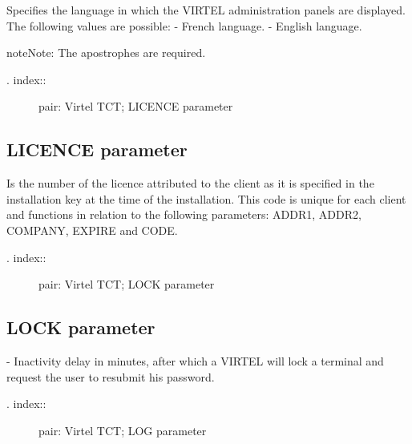 \documentclass[letterpaper,10pt,english]{sphinxmanual}
\begin{document}
Specifies the language in which the VIRTEL administration panels are displayed. The following values are possible:
 - French language.
 - English language.

\begin{sphinxadmonition}{note}{Note:}
The apostrophes are required.
\end{sphinxadmonition}
\begin{description}
\item[{. index::}] \leavevmode
pair: Virtel TCT; LICENCE parameter

\end{description}


\subsection{LICENCE parameter}
\label{\detokenize{Installation_Guide:licence-parameter}}
\begin{sphinxVerbatim}[commandchars=\\\{\}]
                          
\end{sphinxVerbatim}

Is the number of the licence attributed to the client as it is specified in the installation key at the time of the installation. This code is unique for each client and functions in relation to the following parameters: ADDR1, ADDR2, COMPANY, EXPIRE and CODE.
\begin{description}
\item[{. index::}] \leavevmode
pair: Virtel TCT; LOCK parameter

\end{description}


\subsection{LOCK parameter}
\label{\detokenize{Installation_Guide:lock-parameter}}
\begin{sphinxVerbatim}[commandchars=\\\{\}]
                               
\end{sphinxVerbatim}

 - Inactivity delay in minutes, after which a VIRTEL will lock a terminal and request the user to resubmit his password.
\begin{description}
\item[{. index::}] \leavevmode
pair: Virtel TCT; LOG parameter

\end{description}
\end{document}
